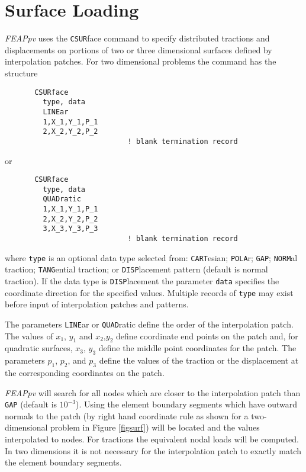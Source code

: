 \section{Surface Loading}
\label{surf}

{\sl FEAPpv} uses the {\tt CSUR}face command to specify distributed tractions
and displacements on portions of two or three dimensional
surfaces defined by interpolation patches.
For two dimensional problems the command has the structure
\begin{verbatim}
       CSURface
         type, data
         LINEar
         1,X_1,Y_1,P_1
         2,X_2,Y_2,P_2
                             ! blank termination record
\end{verbatim}
or
\begin{verbatim}
       CSURface
         type, data
         QUADratic
         1,X_1,Y_1,P_1
         2,X_2,Y_2,P_2
         3,X_3,Y_3,P_3
                             ! blank termination record
\end{verbatim}
where {\tt type} is an optional data type selected from:
{\tt CART}esian; {\tt POLA}r; {\tt GAP};
{\tt NORM}al traction;
{\tt TANG}ential traction; or {\tt DISP}lacement pattern (default is normal
traction).
If the data type is {\tt DISP}lacement the parameter {\tt data} specifies
the coordinate direction for the specified values.
Multiple records of {\tt type} may exist before input of interpolation
patches and patterns.

The parameters {\tt LINE}ar or {\tt QUAD}ratic define the order of the
interpolation patch.  The values of $x_1$, $y_1$ and $x_2$,$y_2$ define
coordinate end points on the patch and,
for quadratic surfaces, $x_3$, $y_3$ define
the middle point coordinates for the patch.
The parameters $p_1$, $p_2$, and $p_3$ define the values of the traction
or the displacement at the corresponding coordinates on the patch.

{\sl FEAPpv} will search for all nodes which are closer to the interpolation
patch than {\tt GAP} (default is $10^{-3}$).  Using the element boundary
segments which have outward normals to the patch (by right hand coordinate
rule as shown for a two-dimensional problem in Figure \ref{figsurf})
will be located and the values interpolated to nodes.  For tractions
the equivalent nodal loads will be computed.  In two dimensions it is
not necessary for the interpolation patch to exactly match the element
boundary segments.


